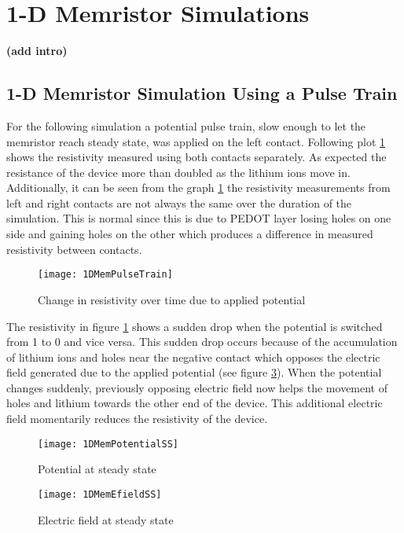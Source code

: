 {\clearpage
\section{1-D Memristor Simulations}
\textbf{(add intro)}
\subsection{1-D Memristor Simulation Using a Pulse Train}
  
For the following simulation a potential pulse train, slow enough to let the memristor reach steady state, was applied on the left contact. Following plot \ref{MemResTrain} shows the resistivity measured using both contacts separately. As expected the resistance of the device more than doubled as the lithium ions move in. Additionally, it can be seen from the graph \ref{MemResTrain} the resistivity measurements from left and right contacts are not always the same over the duration of the simulation. This is normal since this is due to PEDOT layer losing holes on one side and gaining holes on the other which produces a difference in measured resistivity between contacts. 

\begin{figure}[!htp]
\centering
\texttt{[image: 1DMemPulseTrain]}
\caption{Change in resistivity over time due to applied potential} 
\label{MemResTrain}
\end{figure}

The resistivity in figure \ref{MemResTrain} shows a sudden drop when the potential is switched from 1 to 0 and vice versa. This sudden drop occurs because of the accumulation of lithium ions and holes near the negative contact which opposes the electric field generated due to the applied potential (see figure \ref{MemEss}). When the potential changes suddenly, previously opposing electric field now helps the movement of holes and lithium towards the other end of the device. This additional electric field momentarily reduces the resistivity of the device.

\begin{figure}[!htp]
\centering
\texttt{[image: 1DMemPotentialSS]}
\caption{Potential at steady state} 
\label{MemVss}
\end{figure}


\begin{figure}[!htp]
\centering
\texttt{[image: 1DMemEfieldSS]}
\caption{Electric field at steady state} 
\label{MemEss}
\end{figure}

}
